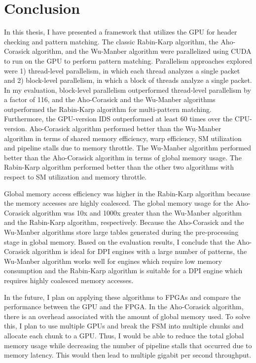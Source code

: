 \chapter{Conclusion}

In this thesis, I have presented a framework that utilizes the GPU for header checking and pattern matching. The classic Rabin-Karp algorithm, the Aho-Corasick algorithm, and the Wu-Manber algorithm were parallelized using CUDA to run on the GPU to perform pattern matching. Parallelism approaches explored were 1) thread-level parallelism, in which each thread analyzes a single packet and 2) block-level parallelism, in which a block of threads analyze a single packet. In my evaluation, block-level parallelism outperformed thread-level parallelism by a factor of 116, and the Aho-Corasick and the Wu-Manber algorithms outperformed the Rabin-Karp algorithm for multi-pattern matching. Furthermore, the GPU-version IDS outperformed at least 60 times over the CPU-version. Aho-Corasick algorithm performed better than the Wu-Manber algorithm in terms of shared memory efficiency, warp efficiency, SM utilization and pipeline stalls due to memory throttle. The Wu-Manber algorithm performed better than the Aho-Corasick algorithm in terms of global memory usage. The Rabin-Karp algorithm performed better than the other two algorithms with respect to SM utilization and memory throttle.

Global memory access efficiency was higher in the Rabin-Karp algorithm because the memory accesses are highly coalesced. The global memory usage for the Aho-Corasick algorithm was 10x and 1000x greater than the Wu-Manber algorithm and the Rabin-Karp algorithm, respectively. Because the Aho-Corasick and the Wu-Manber algorithms store large tables generated during the pre-processing stage in global memory. Based on the evaluation results, I conclude that the Aho-Corasick algorithm is ideal for DPI engines with a large number of patterns, the Wu-Manber algorithm works well for engines which require low memory consumption and the Rabin-Karp algorithm is suitable for a DPI engine which requires highly coalesced memory accesses. 

In the future, I plan on applying these algorithms to FPGAs and compare the performance between the GPU and the FPGA. In the Aho-Corasick algorithm, there is an overhead associated with the amount of global memory used. To solve this, I plan to use multiple GPUs and break the FSM into multiple chunks and allocate each chunk to a GPU. Thus, I would be able to reduce the total global memory usage while decreasing the number of pipeline stalls that occurred due to memory latency. This would then lead to multiple gigabit per second throughput. 